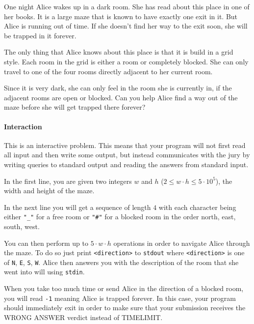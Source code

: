 



\makeheader

One night Alice wakes up in a dark room. She has read about this place in one of her books. It is a large maze that is known to have exactly one exit in it. But Alice is running out of time. If she doesn't find her way to the exit soon, she will be trapped in it forever.

The only thing that Alice knows about this place is that it is build in a grid style. Each room in the grid is either a room or completely blocked. She can only travel to one of the four rooms directly adjacent to her current room.

Since it is very dark, she can only feel in the room she is currently in, if the adjacent rooms are open or blocked. Can you help Alice find a way out of the maze before she will get trapped there forever?

\paragraph*{Interaction}

This is an interactive problem. This means that your program will not first read all input and then write some output, but instead communicates with the jury by writing queries to standard output and reading the answers from standard input.

In the first line, you are given two integers $w$ and $h$ ($2\leq w \cdot h \leq 5 \cdot 10^5$), the width and height of the maze.

In the next line you will get a sequence of length $4$ with each character being either \texttt{"\_"} for a free room or \texttt{"\#"} for a blocked room in the order north, east, south, west.

You can then perform up to $5 \cdot w \cdot h$ operations in order to navigate Alice through the maze. To do so just print \texttt{<direction>} to \texttt{stdout} where \texttt{<direction>} is one of \texttt{N}, \texttt{E}, \texttt{S}, \texttt{W}. Alice then answers you with the description of the room that she went into will using \texttt{stdin}. 

When you take too much time or send Alice in the direction of a blocked room, you will read \texttt{-1} meaning Alice is trapped forever. In this case, your program should immediately exit in order to make sure that your submission receives the WRONG ANSWER verdict instead of TIMELIMIT.

